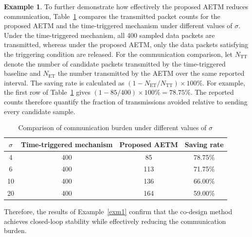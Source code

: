 \documentclass[preprint,review,fleqn,sort&compress,3p]{elsarticle}
\theoremstyle{definition} %
\theoremstyle{definition}%
\newtheorem{example}{Example}
\begin{document}
\begin{example}
To further demonstrate how effectively the proposed AETM reduces communication,
Table~\ref{tab:sigma_effect} compares the transmitted packet counts for the proposed AETM and the time-triggered mechanism under different values of $\sigma$.
Under the time-triggered mechanism, all 400 sampled data packets are transmitted, whereas under the proposed AETM, only the data packets satisfying the triggering condition are released.
For the communication comparison, let $N_{\mathrm{TT}}$ denote the number of candidate packets transmitted by the time-triggered baseline and $N_{\mathrm{ET}}$ the number transmitted by the AETM over the same reported interval. The saving rate is calculated as $(1-N_{\mathrm{ET}}/N_{\mathrm{TT}})\times100\%$. For example, the first row of Table~\ref{tab:sigma_effect} gives $(1-85/400)\times100\%=78.75\%$. The reported counts therefore quantify the fraction of transmissions avoided relative to sending every candidate sample.
\begin{table}[htbp]
	\centering
	\caption{Comparison of communication burden under different values of $\sigma$}
	\label{tab:sigma_effect}
	\begin{tabular}{cccc}
		\toprule
		$\sigma$ & Time-triggered mechanism & Proposed AETM & Saving rate \\
		\midrule
		4  & 400 & 85  & 78.75\% \\
		6  & 400 & 113 & 71.75\% \\
		10 & 400 & 136 & 66.00\% \\
		20 & 400 & 164 & 59.00\% \\
		\bottomrule
	\end{tabular}
\end{table}

Therefore, the results of Example~\ref{exm1} confirm that the co-design method achieves closed-loop stability while effectively reducing the communication burden.

\end{example}
\end{document}
